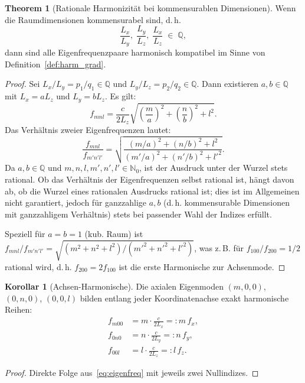﻿\documentclass[12pt, a4paper]{article}
\theoremstyle{definition}
\newtheorem{korollar}{Korollar}[section]
\newtheorem{theorem}{Theorem}[section]
\theoremstyle{remark}
\newcommand{\N}{\mathbb{N}}
\newcommand{\Lx}{L_x}
\newcommand{\Ly}{L_y}
\newcommand{\Lz}{L_z}
\begin{document}
\begin{theorem}[Rationale Harmonizität bei kommensurablen Dimensionen]
\label{thm:harmonie_3d}
Wenn die Raumdimensionen kommensurabel sind, d.\,h.
\begin{equation}
  \frac{\Lx}{\Ly},\; \frac{\Ly}{\Lz},\; \frac{\Lx}{\Lz} \;\in\; \mathbb{Q},
  \label{eq:kommens}
\end{equation}
dann sind alle Eigenfrequenzpaare harmonisch kompatibel im Sinne von
Definition~\ref{def:harm_grad}.
\end{theorem}

\begin{proof}
Sei $\Lx/\Ly = p_1/q_1 \in \mathbb{Q}$ und $\Ly/\Lz = p_2/q_2 \in \mathbb{Q}$.
Dann existieren $a, b \in \mathbb{Q}$ mit $\Lx = a\Lz$ und $\Ly = b\Lz$.
Es gilt:
\[
  f_{mnl} = \frac{c}{2\Lz}\sqrt{\left(\frac{m}{a}\right)^2
  + \left(\frac{n}{b}\right)^2 + l^2}.
\]
Das Verhältnis zweier Eigenfrequenzen lautet:
\[
  \frac{f_{mnl}}{f_{m'n'l'}}
  = \sqrt{\frac{(m/a)^2 + (n/b)^2 + l^2}{(m'/a)^2 + (n'/b)^2 + l'^2}}.
\]
Da $a, b \in \mathbb{Q}$ und $m,n,l,m',n',l' \in \N_0$, ist der Ausdruck
unter der Wurzel stets rational. Ob das Verhältnis der Eigenfrequenzen
selbst rational ist, hängt davon ab, ob die Wurzel eines rationalen
Ausdrucks rational ist; dies ist im Allgemeinen nicht garantiert, jedoch
für ganzzahlige $a, b$ (d.\,h. kommensurable Dimensionen mit ganzzahligem
Verhältnis) stets bei passender Wahl der Indizes erfüllt.

Speziell für $a = b = 1$ (kub. Raum) ist $f_{mnl}/f_{m'n'l'} =
\sqrt{(m^2+n^2+l^2)/(m'^2+n'^2+l'^2)}$, was z.\,B. für $f_{100}/f_{200} = 1/2$
rational wird, d.\,h. $f_{200} = 2f_{100}$ ist die erste Harmonische
zur Achsenmode. 
\end{proof}

\begin{korollar}[Achsen-Harmonische]
\label{kor:achsen_harm}
Die axialen Eigenmoden $(m,0,0)$, $(0,n,0)$, $(0,0,l)$ bilden entlang
jeder Koordinatenachse exakt harmonische Reihen:
\begin{align*}
  f_{m00} &= m \cdot \frac{c}{2\Lx} =: m\,f_x,\\
  f_{0n0} &= n \cdot \frac{c}{2\Ly} =: n\,f_y,\\
  f_{00l} &= l \cdot \frac{c}{2\Lz} =: l\,f_z.
\end{align*}
\end{korollar}

\begin{proof}
Direkte Folge aus~\eqref{eq:eigenfreq} mit jeweils zwei Nullindizes. 
\end{proof}
\end{document}
